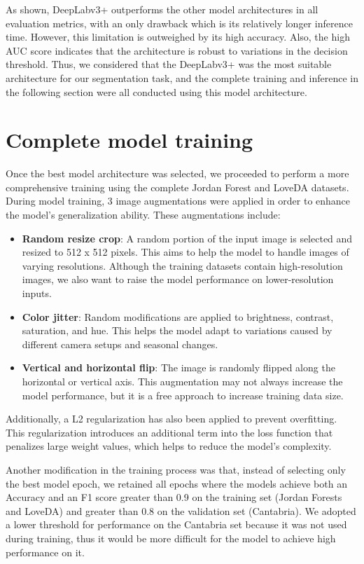As shown, DeepLabv3+ outperforms the other model architectures in all evaluation metrics, with an only drawback which is its relatively longer inference time. However, this limitation is outweighed by its high accuracy. Also, the high AUC score indicates that the architecture is robust to variations in the decision threshold. Thus, we considered that the DeepLabv3+ was the most suitable architecture for our segmentation task, and the complete training and inference in the following section were all conducted using this model architecture.\\


\section{Complete model training}
Once the best model architecture was selected, we proceeded to perform a more comprehensive training using the complete Jordan Forest and LoveDA datasets. During model training, 3 image augmentations were applied in order to enhance the model’s generalization ability. These augmentations include:\\



\begin{itemize}
    \item \textbf{Random resize crop}: A random portion of the input image is selected and resized to 512 x 512 pixels. This aims to help the model to handle images of varying resolutions. Although the training datasets contain high-resolution images, we also want to raise the model performance on lower-resolution inputs.
    \item \textbf{Color jitter}: Random modifications are applied to brightness, contrast, saturation, and hue. This helps the model adapt to variations caused by different camera setups and seasonal changes. 
    \item \textbf{Vertical and horizontal flip}: The image is randomly flipped along the horizontal or vertical axis. This augmentation may not always increase the model performance, but it is a free approach to increase training data size. 
\end{itemize}

Additionally, a L2 regularization has also been applied to prevent overfitting. This regularization introduces an additional term into the loss function that penalizes large weight values, which helps to reduce the model's complexity.

Another modification in the training process was that, instead of selecting only the best model epoch, we retained all epochs where the models achieve both an Accuracy and an F1 score greater than 0.9 on the training set (Jordan Forests and LoveDA) and greater than 0.8 on the validation set (Cantabria). We adopted a lower threshold for performance on the Cantabria set because it was not used during training, thus it would be more difficult for the model to achieve high performance on it.

